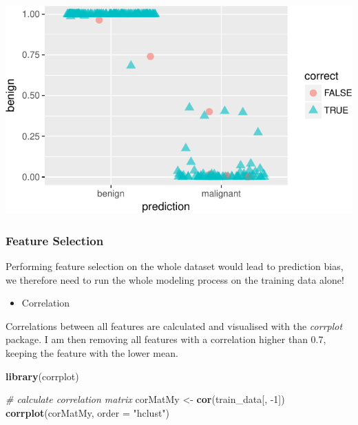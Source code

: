 \documentclass[]{article}
\newenvironment{Shaded}{\begin{snugshade}}{\end{snugshade}}
\newcommand{\KeywordTok}[1]{\textcolor[rgb]{0.13,0.29,0.53}{\textbf{{#1}}}}
\newcommand{\DataTypeTok}[1]{\textcolor[rgb]{0.13,0.29,0.53}{{#1}}}
\newcommand{\DecValTok}[1]{\textcolor[rgb]{0.00,0.00,0.81}{{#1}}}
\newcommand{\StringTok}[1]{\textcolor[rgb]{0.31,0.60,0.02}{{#1}}}
\newcommand{\CommentTok}[1]{\textcolor[rgb]{0.56,0.35,0.01}{\textit{{#1}}}}
\newcommand{\NormalTok}[1]{{#1}}
\providecommand{\tightlist}{%
  \setlength{\itemsep}{0pt}\setlength{\parskip}{0pt}}
\begin{document}
\includegraphics{webinar_code_files/figure-latex/results_jitter_xgb-1.pdf}

\subsubsection{Feature Selection}\label{feature-selection}

Performing feature selection on the whole dataset would lead to
prediction bias, we therefore need to run the whole modeling process on
the training data alone!

\begin{itemize}
\tightlist
\item
  Correlation
\end{itemize}

Correlations between all features are calculated and visualised with the
\emph{corrplot} package. I am then removing all features with a
correlation higher than 0.7, keeping the feature with the lower mean.

\begin{Shaded}
\begin{Highlighting}[]
\KeywordTok{library}\NormalTok{(corrplot)}

\CommentTok{# calculate correlation matrix}
\NormalTok{corMatMy <-}\StringTok{ }\KeywordTok{cor}\NormalTok{(train_data[, -}\DecValTok{1}\NormalTok{])}
\KeywordTok{corrplot}\NormalTok{(corMatMy, }\DataTypeTok{order =} \StringTok{"hclust"}\NormalTok{)}
\end{Highlighting}
\end{Shaded}
\end{document}
